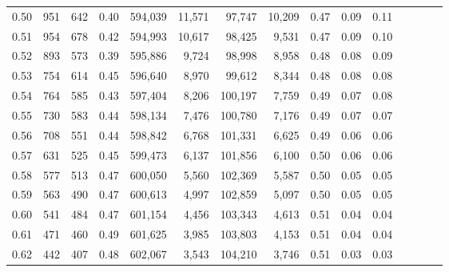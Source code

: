 \begin{tabular}{rrrcrrrrrrrrrrr}
0.50 &     951 &    642 &                                       0.40 &  594,039 &   11,571 &   97,747 &   10,209 &  0.47 &  0.09 &                         0.11 \\
0.51 &     954 &    678 &                                       0.42 &  594,993 &   10,617 &   98,425 &    9,531 &  0.47 &  0.09 &                         0.10 \\
0.52 &     893 &    573 &                                       0.39 &  595,886 &    9,724 &   98,998 &    8,958 &  0.48 &  0.08 &                         0.09 \\
0.53 &     754 &    614 &                                       0.45 &  596,640 &    8,970 &   99,612 &    8,344 &  0.48 &  0.08 &                         0.08 \\
0.54 &     764 &    585 &                                       0.43 &  597,404 &    8,206 &  100,197 &    7,759 &  0.49 &  0.07 &                         0.08 \\
0.55 &     730 &    583 &                                       0.44 &  598,134 &    7,476 &  100,780 &    7,176 &  0.49 &  0.07 &                         0.07 \\
0.56 &     708 &    551 &                                       0.44 &  598,842 &    6,768 &  101,331 &    6,625 &  0.49 &  0.06 &                         0.06 \\
0.57 &     631 &    525 &                                       0.45 &  599,473 &    6,137 &  101,856 &    6,100 &  0.50 &  0.06 &                         0.06 \\
0.58 &     577 &    513 &                                       0.47 &  600,050 &    5,560 &  102,369 &    5,587 &  0.50 &  0.05 &                         0.05 \\
0.59 &     563 &    490 &                                       0.47 &  600,613 &    4,997 &  102,859 &    5,097 &  0.50 &  0.05 &                         0.05 \\
0.60 &     541 &    484 &                                       0.47 &  601,154 &    4,456 &  103,343 &    4,613 &  0.51 &  0.04 &                         0.04 \\
0.61 &     471 &    460 &                                       0.49 &  601,625 &    3,985 &  103,803 &    4,153 &  0.51 &  0.04 &                         0.04 \\
0.62 &     442 &    407 &                                       0.48 &  602,067 &    3,543 &  104,210 &    3,746 &  0.51 &  0.03 &                         0.03 \\

\end{tabular}
